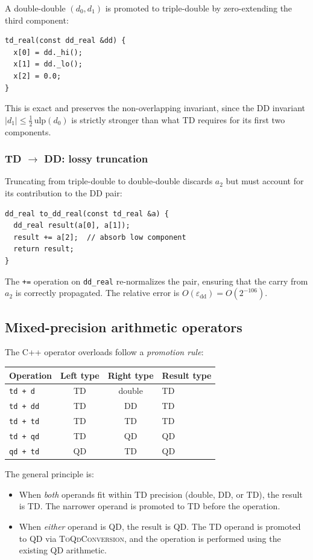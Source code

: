 \documentclass[11pt,a4paper]{article}
\begin{document}
A double-double $(d_0, d_1)$ is promoted to triple-double by
zero-extending the third component:
\begin{lstlisting}
td_real(const dd_real &dd) {
  x[0] = dd._hi();
  x[1] = dd._lo();
  x[2] = 0.0;
}
\end{lstlisting}
This is exact and preserves the non-overlapping invariant, since
the DD invariant $|d_1| \le \frac{1}{2}\,\mathrm{ulp}(d_0)$ is
strictly stronger than what TD requires for its first two components.

\subsubsection{TD $\to$ DD: lossy truncation}

Truncating from triple-double to double-double discards $a_2$ but
must account for its contribution to the DD pair:
\begin{lstlisting}
dd_real to_dd_real(const td_real &a) {
  dd_real result(a[0], a[1]);
  result += a[2];  // absorb low component
  return result;
}
\end{lstlisting}
The \texttt{+=} operation on \texttt{dd\_real} re-normalizes the
pair, ensuring that the carry from $a_2$ is correctly propagated.
The relative error is $O(\varepsilon_{\mathrm{dd}}) = O(2^{-106})$.

\subsection{Mixed-precision arithmetic operators}

The C++ operator overloads follow a \emph{promotion rule}:

\begin{center}
\begin{tabular}{lccl}
\toprule
Operation & Left type & Right type & Result type \\
\midrule
\texttt{td + d}   & TD     & double & TD \\
\texttt{td + dd}  & TD     & DD     & TD \\
\texttt{td + td}  & TD     & TD     & TD \\
\texttt{td + qd}  & TD     & QD     & QD \\
\texttt{qd + td}  & QD     & TD     & QD \\
\bottomrule
\end{tabular}
\end{center}

The general principle is:
\begin{itemize}
\item When \emph{both} operands fit within TD precision (double,
  DD, or TD), the result is TD.  The narrower operand is promoted
  to TD before the operation.
\item When \emph{either} operand is QD, the result is QD.  The TD
  operand is promoted to QD via \textsc{ToQdConversion}, and the
  operation is performed using the existing QD arithmetic.
\end{itemize}
\end{document}
